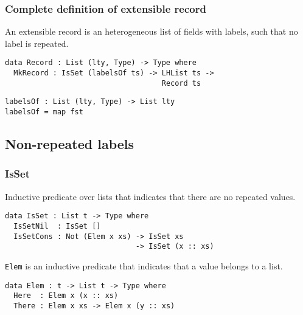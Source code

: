 \documentclass{beamer}
\begin{document}
\begin{frame}[fragile]
\frametitle{Complete definition of extensible record}

An extensible record is an heterogeneous list of fields with labels, such that no label is repeated.

\pause

\begin{definition}
\begin{verbatim}
data Record : List (lty, Type) -> Type where
  MkRecord : IsSet (labelsOf ts) -> LHList ts ->
                                    Record ts
\end{verbatim}
\end{definition}

\begin{definition}
\begin{verbatim}
labelsOf : List (lty, Type) -> List lty
labelsOf = map fst
\end{verbatim}
\end{definition}

\end{frame}

\subsection{Non-repeated labels}

\begin{frame}[fragile]
\frametitle{IsSet}

Inductive predicate over lists that indicates that there are no repeated values.

\pause

\begin{definition}
\begin{verbatim}
data IsSet : List t -> Type where
  IsSetNil  : IsSet []
  IsSetCons : Not (Elem x xs) -> IsSet xs
                              -> IsSet (x :: xs)
\end{verbatim}
\end{definition}

\pause

\texttt{Elem} is an inductive predicate that indicates that a value belongs to a list.

\begin{definition}
\begin{verbatim}
data Elem : t -> List t -> Type where
  Here  : Elem x (x :: xs)
  There : Elem x xs -> Elem x (y :: xs)
\end{verbatim}
\end{definition}

\end{frame}
\end{document}
